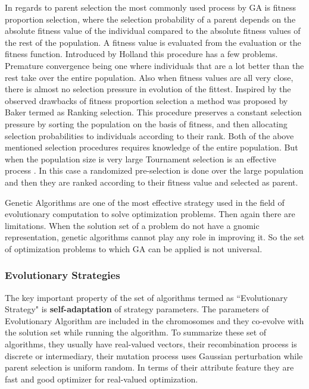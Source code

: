 \documentclass[letterpaper]{article}
\numberwithin{equation}{section}
\begin{document}
In regards to parent selection the most commonly used process by GA is fitness proportion selection, where the selection probability of a parent depends on the absolute fitness value of the individual compared to the absolute fitness values of the rest of the population. A fitness value is evaluated from the evaluation or the fitness function. Introduced by Holland \cite{holland1975} this procedure has a few problems. Premature convergence being one where individuals that are a lot better than the rest take over the entire population. Also when fitness values are all very close, there is almost no selection pressure in evolution of the fittest. Inspired by the observed drawbacks of fitness proportion selection a method was proposed by Baker \cite{baker1987} termed as Ranking selection. This procedure preserves a constant selection pressure by sorting the population on the basis of fitness, and then allocating selection probabilities to individuals according to their rank. Both of the above mentioned selection procedures requires knowledge of the entire population. But when the population size is very large Tournament selection is an effective process \cite{eiben2003}. In this case a randomized pre-selection is done over the large population and then they are ranked according to their fitness value and selected as parent. 

Genetic Algorithms are one of the most effective strategy used in the field of evolutionary computation to solve optimization problems. Then again there are limitations. When the solution set of a problem do not have a gnomic representation, genetic algorithms cannot play any role in improving it. So the set of optimization problems to which GA can be applied is not universal.

\subsubsection{Evolutionary Strategies}
The key important property of the set of algorithms termed as ``Evolutionary Strategy" is \textbf{self-adaptation} of strategy parameters. The  parameters of Evolutionary Algorithm are included in the chromosomes and they co-evolve with the solution set while running the algorithm. To summarize these set of algorithms, they usually have real-valued vectors, their recombination process is discrete or intermediary, their mutation process uses Gaussian perturbation while parent selection is uniform random. In terms of their attribute feature they are fast and good optimizer for real-valued optimization.
\end{document}
